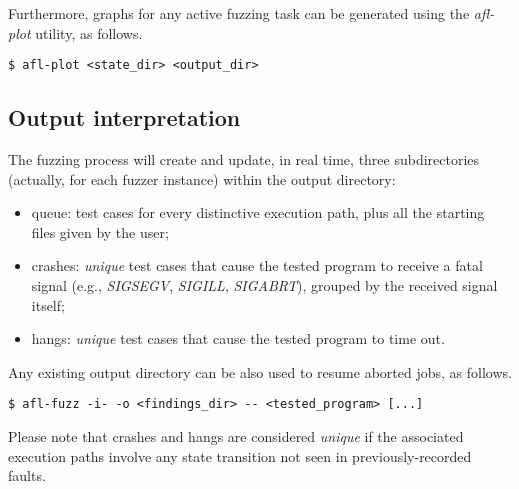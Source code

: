 Furthermore, graphs for any active fuzzing task can be generated using the \textit{afl-plot} utility, as follows\parencite{AFL_readme}.
\begin{lstlisting}
$ afl-plot <state_dir> <output_dir>
\end{lstlisting}

\subsection{Output interpretation}
The fuzzing process will create and update, in real time, three subdirectories (actually, for each fuzzer instance) within the output directory\parencite{AFL_readme}:
\begin{itemize}[itemsep=1.5pt]
    \item queue: test cases for every distinctive execution path, plus all the starting files given by the user;
    \item crashes: \textit{unique} test cases that cause the tested program to receive a fatal signal (e.g., \textit{SIGSEGV}, \textit{SIGILL}, \textit{SIGABRT}), grouped by the received signal itself;
    \item hangs: \textit{unique} test cases that cause the tested program to time out.
\end{itemize}
Any existing output directory can be also used to resume aborted jobs, as follows\parencite{AFL_readme}.
\begin{lstlisting}
$ afl-fuzz -i- -o <findings_dir> -- <tested_program> [...]
\end{lstlisting}

Please note that crashes and hangs are considered \textit{unique} if the associated execution paths involve any state transition not seen in previously-recorded faults.